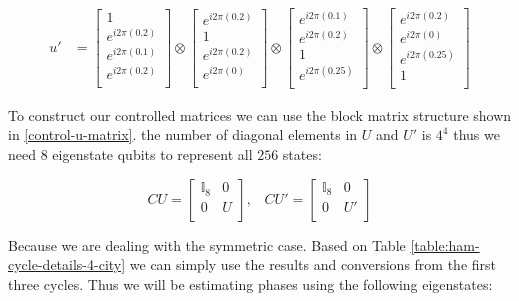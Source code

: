 \documentclass[msc,oneside]{ubcthesis}
\begin{document}
	\begin{align*}	
		u' & = \begin{bmatrix}
			1 \\
			e^{i2\pi(0.2)} \\
			e^{i2\pi(0.1)} \\
			e^{i2\pi(0.2)} \\
		\end{bmatrix} 
		\otimes \begin{bmatrix}
			e^{i2\pi(0.2)} \\
			1 \\
			e^{i2\pi(0.2)} \\
			e^{i2\pi(0)} \\
		\end{bmatrix}
		\otimes \begin{bmatrix}
			e^{i2\pi(0.1)} \\
			e^{i2\pi(0.2)} \\
			1\\
			e^{i2\pi(0.25)} \\
		\end{bmatrix} 
		\otimes \begin{bmatrix}
			e^{i2\pi(0.2)} \\
			e^{i2\pi(0)} \\
			e^{i2\pi(0.25)} \\
			1 \\
		\end{bmatrix} 						 			
	\end{align*}
	
	To construct our controlled matrices we can use the block matrix structure shown in \ref{control-u-matrix}. the number of diagonal elements in $U$ and $U'$ is $4^4$ thus we need $8$ eigenstate qubits to represent all $256$ states:
	
	\begin{equation*}
		CU = \begin{bmatrix}
			\mathbb{I}_8 & 0 \\
			0 & U \\
		\end{bmatrix},\;\;\;
		CU' = \begin{bmatrix}
			\mathbb{I}_8 & 0 \\
			0 & U' \\
		\end{bmatrix}
	\end{equation*}
	
	
	Because we are dealing with the symmetric case. Based on Table \ref{table:ham-cycle-details-4-city} we can simply use the results and conversions from the first three cycles. Thus we will be estimating phases using the following eigenstates:
	
\end{document}

